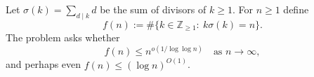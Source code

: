 Let $\sigma(k)=\sum_{d\mid k} d$ be the sum of divisors of $k\ge 1$. For $n\ge 1$ define
\[
f(n):=\#\{k\in\mathbb Z_{\ge 1}:\ k\sigma(k)=n\}.
\]
The problem asks whether
\[
f(n)\le n^{o(1/\log\log n)}\quad\text{as }n\to\infty,
\]
and perhaps even $f(n)\le (\log n)^{O(1)}$.
